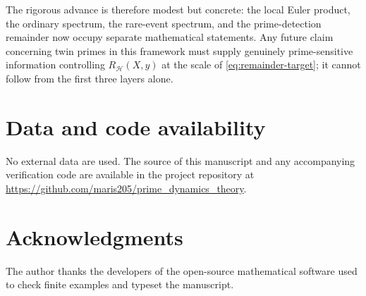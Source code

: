 \documentclass[11pt]{article}
\theoremstyle{definition}
\theoremstyle{remark}
\newcommand{\cH}{\mathcal H}
\begin{document}
The rigorous advance is therefore modest but concrete: the local Euler product, the ordinary spectrum, the rare-event spectrum, and the prime-detection remainder now occupy separate mathematical statements.  Any future claim concerning twin primes in this framework must supply genuinely prime-sensitive information controlling $R_{\cH}(X,y)$ at the scale of \eqref{eq:remainder-target}; it cannot follow from the first three layers alone.

\section*{Data and code availability}

No external data are used.  The source of this manuscript and any accompanying verification code are available in the project repository at
\url{https://github.com/maris205/prime_dynamics_theory}.

\section*{Acknowledgments}

The author thanks the developers of the open-source mathematical software used to check finite examples and typeset the manuscript.



\end{document}
